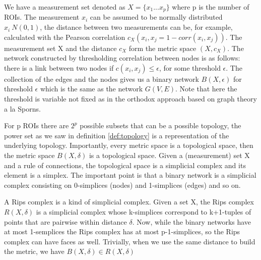 \documentclass[onecollarge,runningheads]{svjour2}
\begin{document}
\begin{example}

We have a measurement set denoted as $X= \{ x_1 ... x_p\}$ where p is the number of ROIs. The measurement $x_i$ can be assumed to be normally distributed $x_i ~ N(0,1)$, the distance between two measurements can be, for example, calculated with the Pearson correlation $c_{X}(x_i,x_j= 1 - corr(x_i,x_j))$. 
The measurement set X and the distance $c_X$ form the metric space $(X,c_X)$. The network constructed by thresholding correlation between nodes is as follows:
there is a link between two nodes if $c(x_i,x_j) \leq \epsilon$, for some threshold $\epsilon$. The collection of the edges and the nodes gives us a binary network $B(X,\epsilon)$ for threshold $\epsilon$ which is the same as the network $G(V,E)$. Note that here the threshold is variable not fixed as in the orthodox approach based on graph theory a la Sporns.

For p ROIs there are $2^p$ possible subsets that can be a possible topology, the power set as we saw in definition \ref{def:topology} is a representation of the underlying topology.
Importantly, every metric space is a topological space, then the metric space $B(X, \delta)$ is a topological space. 
Given a (measurement) set X and a rule of connections, the topological space is a simplicial complex and its element is a simplex. %
The important point is that a binary network is a simplicial complex consisting on 0-simplices (nodes) and 1-simplices (edges) and so on.

A Rips complex is a kind of simplicial complex. Given a set X, the Rips complex $R(X,\delta)$ is a simplicial complex whose k-simplices correspond to k+1-tuples of points that are pairwise within distance $\delta$. 
Now, while the binary networks have at most 1-semplices the Rips complex has at most p-1-simplices, so the Rips complex can have faces as well. Trivially, when we use the same distance to build the metric, we have $B(X,\delta) \in R(X,\delta)$
\end{example}
\end{document}
